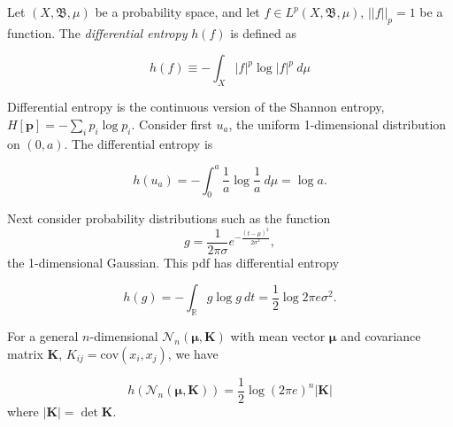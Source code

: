 \documentclass{article}
\newcommand{\mv}[1]{\mathbf{#1}}	%
\newcommand{\cov}{\mathrm{cov}}
\begin{document}
Let $(X, \mathfrak{B}, \mu)$ be a probability space, and let $f \in L^p(X, \mathfrak{B}, \mu)$, $||f||_{p} = 1$ be a function.  The \emph{differential entropy} $h(f)$ is defined as

\begin{equation}
h(f) \equiv -\int_{X} |f|^p \log |f|^p\ d\mu
\end{equation}

Differential entropy is the continuous version of the Shannon entropy, $H[\mv{p}] = -\sum_{i} p_i \log p_i$.  Consider first $u_a$, the uniform 1-dimensional distribution on $(0,a)$.  The differential entropy is

\begin{equation}
h(u_a) = -\int_{0}^{a} \frac{1}{a} \log \frac{1}{a}\ d\mu = \log a.
\end{equation}

Next consider probability distributions such as the function
\begin{equation}
g = \frac{1}{2 \pi \sigma}e^{-\frac{(t-\mu)^2}{2 \sigma^2}},
\end{equation}
the 1-dimensional Gaussian.  This pdf has differential entropy

\begin{equation}
h(g) = -\int_{\mathbb{R}} g \log g\ dt = \frac{1}{2} \log 2 \pi e \sigma^2.
\end{equation}

For a general $n$-dimensional     $\mathcal{N}_{n}(\mv{\mu},\mv{K})$ with mean vector $\mv{\mu}$ and covariance matrix $\mv{K}$, $K_{ij} = \cov(x_i, x_j)$, we have

\begin{equation}
h(\mathcal{N}_{n}(\mv{\mu},\mv{K})) = \frac{1}{2} \log (2 \pi e)^n |\mv{K}|
\end{equation}
where $|\mv{K}| = \det{\mv{K}}$.
\end{document}
